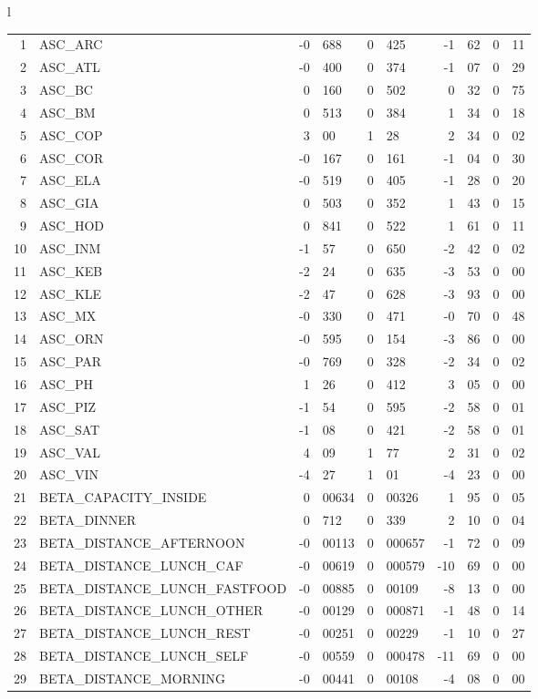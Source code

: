 \begin{tabular}{l}
\begin{tabular}{rlr@{.}lr@{.}lr@{.}lr@{.}l}
1 & ASC_ARC & -0&688 & 0&425 & -1&62 & 0&11\\
2 & ASC_ATL  & -0&400 & 0&374 & -1&07 & 0&29\\
3 & ASC_BC & 0&160 & 0&502 & 0&32 & 0&75\\
4 & ASC_BM  & 0&513 & 0&384 & 1&34 & 0&18\\
5 & ASC_COP & 3&00 & 1&28 & 2&34 & 0&02\\
6 & ASC_COR  & -0&167 & 0&161 & -1&04 & 0&30\\
7 & ASC_ELA  & -0&519 & 0&405 & -1&28 & 0&20\\
8 & ASC_GIA  & 0&503 & 0&352 & 1&43 & 0&15\\
9 & ASC_HOD  & 0&841 & 0&522 & 1&61 & 0&11\\
10 & ASC_INM  & -1&57 & 0&650 & -2&42 & 0&02\\
11 & ASC_KEB  & -2&24 & 0&635 & -3&53 & 0&00\\
12 & ASC_KLE & -2&47 & 0&628 & -3&93 & 0&00\\
13 & ASC_MX  & -0&330 & 0&471 & -0&70 & 0&48\\
14 & ASC_ORN  & -0&595 & 0&154 & -3&86 & 0&00\\
15 & ASC_PAR  & -0&769 & 0&328 & -2&34 & 0&02\\
16 & ASC_PH  & 1&26 & 0&412 & 3&05 & 0&00\\
17 & ASC_PIZ  & -1&54 & 0&595 & -2&58 & 0&01\\
18 & ASC_SAT  & -1&08 & 0&421 & -2&58 & 0&01\\
19 & ASC_VAL  & 4&09 & 1&77 & 2&31 & 0&02\\
20 & ASC_VIN & -4&27 & 1&01 & -4&23 & 0&00\\
21 & BETA_CAPACITY_INSIDE & 0&00634 & 0&00326 & 1&95 & 0&05\\
22 & BETA_DINNER & 0&712 & 0&339 & 2&10 & 0&04\\
23 & BETA_DISTANCE_AFTERNOON & -0&00113 & 0&000657 & -1&72 & 0&09\\
24 & BETA_DISTANCE_LUNCH_CAF & -0&00619 & 0&000579 & -10&69 & 0&00\\
25 & BETA_DISTANCE_LUNCH_FASTFOOD & -0&00885 & 0&00109 & -8&13 & 0&00\\
26 & BETA_DISTANCE_LUNCH_OTHER & -0&00129 & 0&000871 & -1&48 & 0&14\\
27 & BETA_DISTANCE_LUNCH_REST & -0&00251 & 0&00229 & -1&10 & 0&27\\
28 & BETA_DISTANCE_LUNCH_SELF & -0&00559 & 0&000478 & -11&69 & 0&00\\
29 & BETA_DISTANCE_MORNING & -0&00441 & 0&00108 & -4&08 & 0&00\\

\end{tabular}
\end{tabular}
